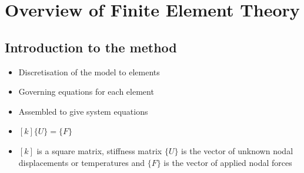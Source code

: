 \chapter{Overview of Finite Element Theory}
\section{Introduction to the method}
\begin{itemize}
	\item Discretisation of the model to elements
	\item Governing equations for each element
	\item Assembled to give system equations
	\item $[k]\{U\} = \{F\}$
	\item $[k]$ is a square matrix, stiffness matrix $\{U\}$ is the vector of unknown nodal displacements or temperatures and $\{F\}$ is the vector of applied nodal forces
\end{itemize}
